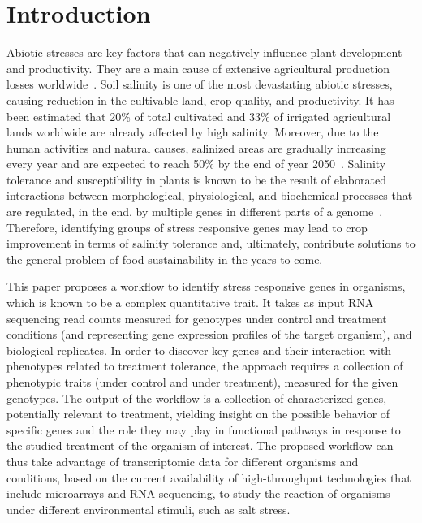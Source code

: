 \section{Introduction}
\label{sec.intro}

Abiotic stresses are key factors that can negatively influence plant
development and productivity. They are a main cause of extensive
agricultural production losses worldwide~\cite{mesterhazy2020losses}. Soil salinity is
one of the most devastating abiotic stresses, causing reduction in the
cultivable land, crop quality, and productivity. It has been estimated
that 20\% of total cultivated and 33\% of irrigated agricultural lands
worldwide are already affected by high salinity. Moreover, due to the
human activities and natural causes, salinized areas are gradually
increasing every year and are expected to reach 50\% by the end of
year 2050~\cite{shrivastava2015soil}. Salinity tolerance and
susceptibility in plants is known to be the result of elaborated
interactions between morphological, physiological, and biochemical
processes that are regulated, in the end, by multiple genes in
different parts of a genome~\cite{reddy2017salt}. Therefore,
identifying groups of stress responsive genes may lead to crop
improvement in terms of salinity tolerance and, ultimately, contribute
solutions to the general problem of food sustainability in the years
to come.


This paper proposes a workflow to identify stress responsive genes in
organisms, which is known to be a complex quantitative trait. It takes
as input RNA sequencing read counts measured for genotypes under
control and treatment conditions (and representing gene expression
profiles of the target organism), and biological replicates.  In order
to discover key genes and their interaction with phenotypes related to
treatment tolerance, the approach requires a collection of phenotypic
traits (under control and under treatment), measured for the given
genotypes. The output of the workflow is a collection of characterized
genes, potentially relevant to treatment, yielding insight on the
possible behavior of specific genes and the role they may play in
functional pathways in response to the studied treatment of the
organism of interest. The proposed workflow can thus take advantage of
transcriptomic data for different organisms and conditions, based on
the current availability of high-throughput technologies that include
microarrays and RNA sequencing, to study the reaction of organisms
under different environmental stimuli, such as salt stress.



